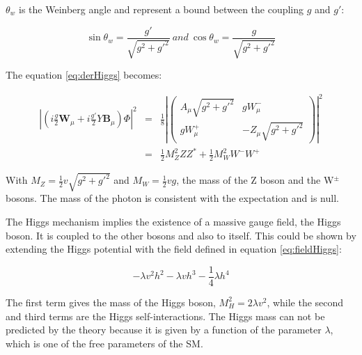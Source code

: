    $\theta_{w}$ is the Weinberg angle and represent a bound between the coupling $g$ and $g'$:
   
   \begin{equation}
   \sin{\theta_{w}} = \frac{g'}{\sqrt{g^2+g'^2}} \ and \ \cos{\theta_{w}} = \frac{g}{\sqrt{g^2+g'^2}}
   \end{equation} 

    The equation \ref{eq:derHiggs} becomes:

    \begin{equation}
      \begin{array}{rcl}
     \left|\left(i\frac{g}{2}\textbf{W}_{\mu} +i\frac{g'}{2}Y\textbf{B}_{\mu}\right) \Phi \right|^2 & = & \frac{1}{8} \left| 
        \begin{pmatrix}
          A_{\mu}\sqrt{g^2 + g'^2} & gW^-_{\mu} \\
          gW^+_{\mu} & -Z_{\mu}\sqrt{g^2 + g'^2}
        \end{pmatrix}
     \right|^2 \\
      & = & \frac{1}{2}M^2_Z ZZ^* + \frac{1}{2}M^2_W W^-W^+
      \end{array}
    \end{equation}

    With $M_Z = \frac{1}{2}v\sqrt{g^2 + g'^2}$ and $M_W = \frac{1}{2} vg$, the mass of the Z boson and the W$^{\pm}$ bosons. 
    The mass of the photon is consistent with the expectation and is null. 

    The Higgs mechanism implies the existence of a massive gauge field, the Higgs boson.
    It is coupled to the other bosons and also to itself.
    This could be shown by extending the Higgs potential with the field defined in equation \ref{eq:fieldHiggs}:

    \begin{equation}
      -\lambda v^2h^2 - \lambda v h^3 - \frac{1}{4}\lambda h^4
    \end{equation}

    The first term gives the mass of the Higgs boson, $M^2_H = 2\lambda v^2$, while the second and third terms are the Higgs self-interactions.
    The Higgs mass can not be predicted by the theory because it is given by a function of the parameter $\lambda$, which is one of the free parameters of the \gls{SM}.
    
